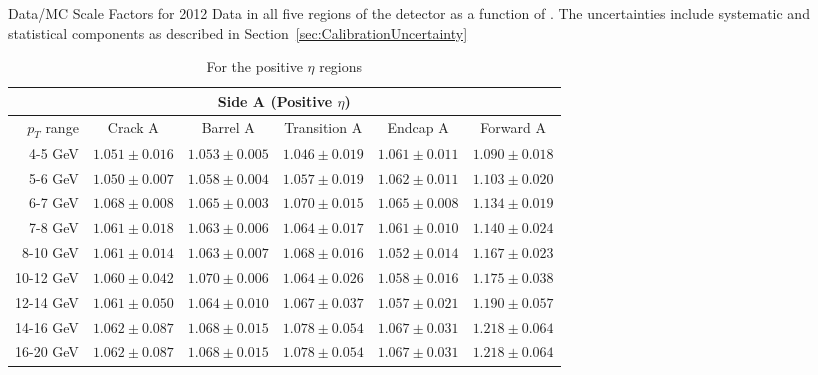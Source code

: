 \begin{table}[bhtp]
  \caption{Data/MC Scale Factors for 2012 Data in all five regions of the detector as a function of \pt. The uncertainties include systematic and statistical components as described in Section~\ref{sec:CalibrationUncertainty}} \label{tab:Calibration2012SF}
  \centering
  \begin{subtable}{\textwidth}
    \centering
    \begin{tabular}{|r|c|c|c|c|c|}
    \hline
    \multicolumn{6}{|c|}{Side A (Positive $\eta$)} \\
    \hline
    $p_{T}$ range & Crack A & Barrel A & Transition A & Endcap A & Forward A\\ \hline \hline
    4-5 GeV   & $1.051\pm0.016$ & $1.053\pm0.005$ & $1.046\pm0.019$ & $1.061\pm0.011$ & $1.090\pm0.018$ \\
    5-6 GeV   & $1.050\pm0.007$ & $1.058\pm0.004$ & $1.057\pm0.019$ & $1.062\pm0.011$ & $1.103\pm0.020$ \\
    6-7 GeV   & $1.068\pm0.008$ & $1.065\pm0.003$ & $1.070\pm0.015$ & $1.065\pm0.008$ & $1.134\pm0.019$ \\
    7-8 GeV   & $1.061\pm0.018$ & $1.063\pm0.006$ & $1.064\pm0.017$ & $1.061\pm0.010$ & $1.140\pm0.024$ \\
    8-10 GeV  & $1.061\pm0.014$ & $1.063\pm0.007$ & $1.068\pm0.016$ & $1.052\pm0.014$ & $1.167\pm0.023$ \\
    10-12 GeV & $1.060\pm0.042$ & $1.070\pm0.006$ & $1.064\pm0.026$ & $1.058\pm0.016$ & $1.175\pm0.038$ \\
    12-14 GeV & $1.061\pm0.050$ & $1.064\pm0.010$ & $1.067\pm0.037$ & $1.057\pm0.021$ & $1.190\pm0.057$ \\
    14-16 GeV & $1.062\pm0.087$ & $1.068\pm0.015$ & $1.078\pm0.054$ & $1.067\pm0.031$ & $1.218\pm0.064$ \\
    16-20 GeV & $1.062\pm0.087$ & $1.068\pm0.015$ & $1.078\pm0.054$ & $1.067\pm0.031$ & $1.218\pm0.064$ \\
    \hline
    \end{tabular}
    \caption{For the positive $\eta$ regions} \label{tab:Calibration2012SFPos}
  \end{subtable}


\end{table}
